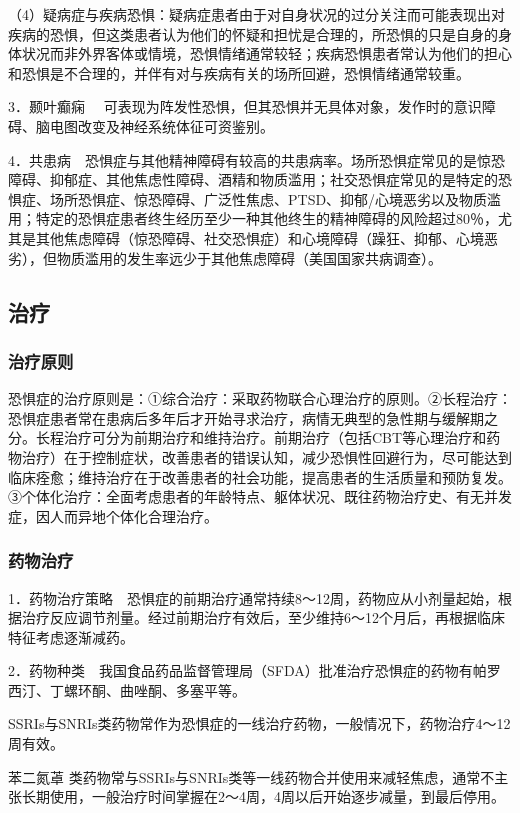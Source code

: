 （4）疑病症与疾病恐惧：疑病症患者由于对自身状况的过分关注而可能表现出对疾病的恐惧，但这类患者认为他们的怀疑和担忧是合理的，所恐惧的只是自身的身体状况而非外界客体或情境，恐惧情绪通常较轻；疾病恐惧患者常认为他们的担心和恐惧是不合理的，并伴有对与疾病有关的场所回避，恐惧情绪通常较重。

3．颞叶癫痫
　可表现为阵发性恐惧，但其恐惧并无具体对象，发作时的意识障碍、脑电图改变及神经系统体征可资鉴别。

4．共患病　恐惧症与其他精神障碍有较高的共患病率。场所恐惧症常见的是惊恐障碍、抑郁症、其他焦虑性障碍、酒精和物质滥用；社交恐惧症常见的是特定的恐惧症、场所恐惧症、惊恐障碍、广泛性焦虑、PTSD、抑郁/心境恶劣以及物质滥用；特定的恐惧症患者终生经历至少一种其他终生的精神障碍的风险超过80％，尤其是其他焦虑障碍（惊恐障碍、社交恐惧症）和心境障碍（躁狂、抑郁、心境恶劣），但物质滥用的发生率远少于其他焦虑障碍（美国国家共病调查）。

\subsection{治疗}

\subsubsection{治疗原则}

恐惧症的治疗原则是：①综合治疗：采取药物联合心理治疗的原则。②长程治疗：恐惧症患者常在患病后多年后才开始寻求治疗，病情无典型的急性期与缓解期之分。长程治疗可分为前期治疗和维持治疗。前期治疗（包括CBT等心理治疗和药物治疗）在于控制症状，改善患者的错误认知，减少恐惧性回避行为，尽可能达到临床痊愈；维持治疗在于改善患者的社会功能，提高患者的生活质量和预防复发。③个体化治疗：全面考虑患者的年龄特点、躯体状况、既往药物治疗史、有无并发症，因人而异地个体化合理治疗。

\subsubsection{药物治疗}

1．药物治疗策略　恐惧症的前期治疗通常持续8～12周，药物应从小剂量起始，根据治疗反应调节剂量。经过前期治疗有效后，至少维持6～12个月后，再根据临床特征考虑逐渐减药。

2．药物种类　我国食品药品监督管理局（SFDA）批准治疗恐惧症的药物有帕罗西汀、丁螺环酮、曲唑酮、多塞平等。

SSRIs与SNRIs类药物常作为恐惧症的一线治疗药物，一般情况下，药物治疗4～12周有效。

苯二氮䓬
类药物常与SSRIs与SNRIs类等一线药物合并使用来减轻焦虑，通常不主张长期使用，一般治疗时间掌握在2～4周，4周以后开始逐步减量，到最后停用。

